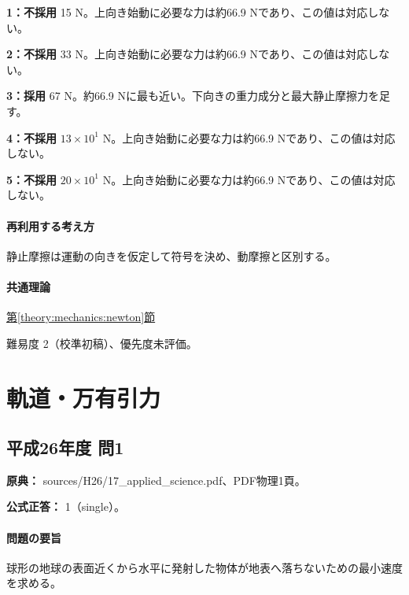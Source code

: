\noindent\textbf{1：不採用} 15 N。上向き始動に必要な力は約66.9 Nであり、この値は対応しない。\par

\noindent\textbf{2：不採用} 33 N。上向き始動に必要な力は約66.9 Nであり、この値は対応しない。\par

\noindent\textbf{3：採用} 67 N。約66.9 Nに最も近い。下向きの重力成分と最大静止摩擦力を足す。\par

\noindent\textbf{4：不採用} \(13\times10^1\) N。上向き始動に必要な力は約66.9 Nであり、この値は対応しない。\par

\noindent\textbf{5：不採用} \(20\times10^1\) N。上向き始動に必要な力は約66.9 Nであり、この値は対応しない。\par

\paragraph{再利用する考え方} 静止摩擦は運動の向きを仮定して符号を決め、動摩擦と区別する。

\paragraph{共通理論} \hyperref[theory:mechanics:newton]{第\ref*{theory:mechanics:newton}節}

\par 難易度 2（校準初稿）、優先度未評価。

\section{軌道・万有引力}

\subsection{平成26年度 問1}
\label{q:h26-reg-applied-01}

\noindent\textbf{原典：} sources/H26/17\_applied\_science.pdf、PDF物理1頁。

\textbf{公式正答：} 1（single）。

\paragraph{問題の要旨} 球形の地球の表面近くから水平に発射した物体が地表へ落ちないための最小速度を求める。

